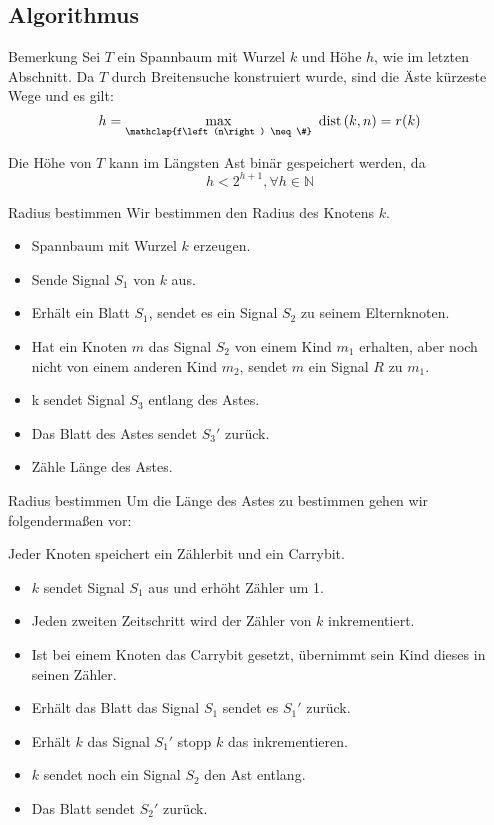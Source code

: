 \documentclass[18pt]{beamer}
\begin{document}
\subsection{Algorithmus}
\begin{frame}
	\begin{exampleblock}{Bemerkung}
		Sei $T$ ein Spannbaum mit Wurzel $k$ und Höhe $h$, wie im letzten Abschnitt. Da $T$ durch Breitensuche konstruiert wurde, sind die Äste kürzeste Wege und es gilt:
		\begin{displaymath}
			h = \max_{\mathclap{f\left(n\right) \neq \#}} \text{ dist}\left(k, n\right) = r(k)
		\end{displaymath}
		
		Die Höhe von $T$ kann im Längsten Ast binär gespeichert werden, da
		\begin{displaymath}
			h < 2^{h + 1} , \forall h \in \mathbb{N}
		\end{displaymath}
	\end{exampleblock}
\end{frame}

\begin{frame}{Radius bestimmen}
	Wir bestimmen den Radius des Knotens $k$.
	\begin{itemize}
		\item Spannbaum mit Wurzel $k$ erzeugen.
		\item Sende Signal $S_1$ von $k$ aus.
		\item Erhält ein Blatt $S_1$, sendet es ein Signal $S_2$ zu seinem Elternknoten.
		\item Hat ein Knoten $m$ das Signal $S_2$ von einem Kind $m_1$ erhalten, aber noch nicht von einem anderen Kind $m_2$, sendet $m$ ein Signal $R$ zu $m_1$.
		\item k sendet Signal $S_3$ entlang des Astes.
		\item Das Blatt des Astes sendet $S_3'$ zurück.
		\item Zähle Länge des Astes. 
	\end{itemize}
\end{frame}

\begin{frame}{Radius bestimmen}
	Um die Länge des Astes zu bestimmen gehen wir folgendermaßen vor:
	
	Jeder Knoten speichert ein Zählerbit und ein Carrybit.
	\begin{itemize}
		\item $k$ sendet Signal $S_1$ aus und erhöht Zähler um 1. 
		\item Jeden zweiten Zeitschritt wird der Zähler von $k$ inkrementiert.
		\item Ist bei einem Knoten das Carrybit gesetzt, übernimmt sein Kind dieses in seinen Zähler.
		\item Erhält das Blatt das Signal $S_1$ sendet es $S_1'$ zurück.
		\item Erhält $k$ das Signal $S_1'$ stopp $k$ das inkrementieren.
		\item $k$ sendet noch ein Signal $S_2$ den Ast entlang.
		\item Das Blatt sendet $S_2'$ zurück.
	\end{itemize}
\end{frame}
\end{document}
